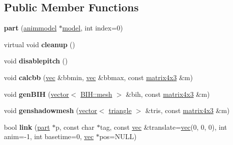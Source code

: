 \subsection*{Public Member Functions}
\begin{DoxyCompactItemize}
\item 
\mbox{\label{structanimmodel_1_1part_a402de05da373ec49c52217c8663c683d}} 
{\bfseries part} (\hyperlink{structanimmodel}{animmodel} $\ast$\hyperlink{structmodel}{model}, int index=0)
\item 
\mbox{\label{structanimmodel_1_1part_a1dea4220aac843a6a3021cff5831e080}} 
virtual void {\bfseries cleanup} ()
\item 
\mbox{\label{structanimmodel_1_1part_afd15bfc598d25ec6b77fd6edf2305c02}} 
void {\bfseries disablepitch} ()
\item 
\mbox{\label{structanimmodel_1_1part_ae0f71076603d4a2445b0d482eb3c711f}} 
void {\bfseries calcbb} (\hyperlink{structvec}{vec} \&bbmin, \hyperlink{structvec}{vec} \&bbmax, const \hyperlink{structmatrix4x3}{matrix4x3} \&m)
\item 
\mbox{\label{structanimmodel_1_1part_af507508178559e7e08af7af51e3f27ff}} 
void {\bfseries gen\+B\+IH} (\hyperlink{structvector}{vector}$<$ \hyperlink{struct_b_i_h_1_1mesh}{B\+I\+H\+::mesh} $>$ \&bih, const \hyperlink{structmatrix4x3}{matrix4x3} \&m)
\item 
\mbox{\label{structanimmodel_1_1part_af479eeef8a1f4c21f9c9a8ca0d5e072e}} 
void {\bfseries genshadowmesh} (\hyperlink{structvector}{vector}$<$ \hyperlink{structtriangle}{triangle} $>$ \&tris, const \hyperlink{structmatrix4x3}{matrix4x3} \&m)
\item 
\mbox{\label{structanimmodel_1_1part_ac7e95384cbc0f33c65fd7dc7d83224aa}} 
bool {\bfseries link} (\hyperlink{structanimmodel_1_1part}{part} $\ast$p, const char $\ast$tag, const \hyperlink{structvec}{vec} \&translate=\hyperlink{structvec}{vec}(0, 0, 0), int anim=-\/1, int basetime=0, \hyperlink{structvec}{vec} $\ast$pos=N\+U\+LL)
\item 
\mbox{\label{structanimmodel_1_1part_a4f481ebcdca9c279641511cd05a5f592}} 

\end{DoxyCompactItemize}
